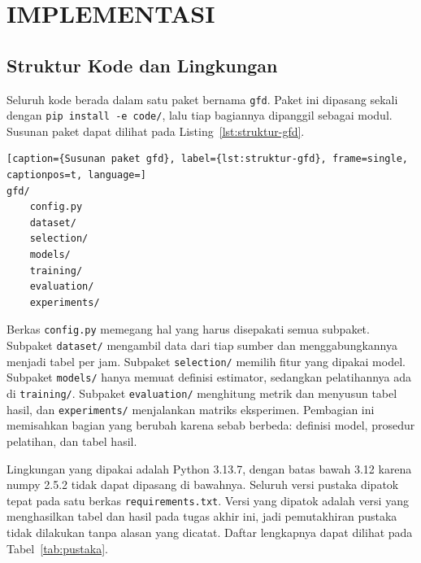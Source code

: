 \cleardoublepage
\chapter{IMPLEMENTASI}
\label{chap:implementasi}

\section{Struktur Kode dan Lingkungan}
\label{sec:struktur-kode}
Seluruh kode berada dalam satu paket bernama \texttt{gfd}.
Paket ini dipasang sekali dengan \texttt{pip install -e code/}, lalu tiap bagiannya dipanggil sebagai modul.
Susunan paket dapat dilihat pada Listing~\ref{lst:struktur-gfd}.

\begin{minipage}{\textwidth}
\begin{lstlisting}[caption={Susunan paket gfd}, label={lst:struktur-gfd}, frame=single, captionpos=t, language=]
gfd/
    config.py
    dataset/
    selection/
    models/
    training/
    evaluation/
    experiments/
\end{lstlisting}
\end{minipage}

Berkas \texttt{config.py} memegang hal yang harus disepakati semua subpaket.
Subpaket \texttt{dataset/} mengambil data dari tiap sumber dan menggabungkannya menjadi tabel per jam.
Subpaket \texttt{selection/} memilih fitur yang dipakai model.
Subpaket \texttt{models/} hanya memuat definisi estimator, sedangkan pelatihannya ada di \texttt{training/}.
Subpaket \texttt{evaluation/} menghitung metrik dan menyusun tabel hasil, dan \texttt{experiments/} menjalankan matriks eksperimen.
Pembagian ini memisahkan bagian yang berubah karena sebab berbeda: definisi model, prosedur pelatihan, dan tabel hasil.

Lingkungan yang dipakai adalah Python 3.13.7, dengan batas bawah 3.12 karena numpy 2.5.2 tidak dapat dipasang di bawahnya.
Seluruh versi pustaka dipatok tepat pada satu berkas \texttt{requirements.txt}.
Versi yang dipatok adalah versi yang menghasilkan tabel dan hasil pada tugas akhir ini, jadi pemutakhiran pustaka tidak dilakukan tanpa alasan yang dicatat.
Daftar lengkapnya dapat dilihat pada Tabel~\ref{tab:pustaka}.

